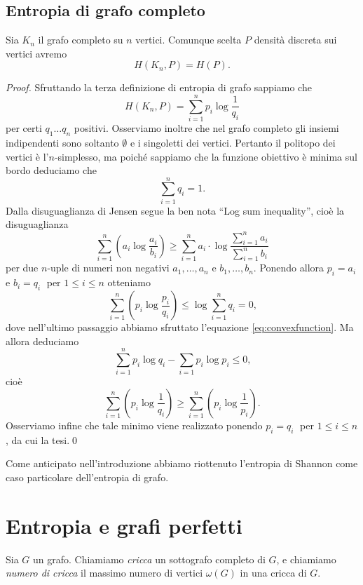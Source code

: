 \subsection{Entropia di grafo completo} 
\begin{proposition}
	Sia \(K_n\) il grafo completo su \(n\) vertici. Comunque scelta \(P\) densità discreta sui vertici avremo
	\[H(K_n,P)=H(P).\]
\end{proposition}
\begin{proof}
	Sfruttando la terza definizione di entropia di grafo sappiamo che
	\[H(K_n,P)=\sum_{i=1}^n p_i \log{\frac{1}{q_i}}\]
	per certi \(q_1\dots q_n\) positivi. Osserviamo inoltre che nel grafo completo gli insiemi indipendenti sono soltanto \(\emptyset\) e i singoletti dei vertici. Pertanto il politopo dei vertici è l'\(n\)-simplesso, ma poiché sappiamo che la funzione obiettivo è minima sul bordo deduciamo che
	\begin{equation} \label{eq:convexfunction}
	  \sum_{i=1}^n q_i = 1.
	\end{equation}
  Dalla disuguaglianza di Jensen segue la ben nota ``Log sum inequality'', cioè la disuguaglianza
  \[
    \sum_{i=1}^n{\left(a_i\log{\frac{a_i}{b_i}}\right)} \ge \sum_{i=1}^n{a_i}\cdot\log{\frac{\sum_{i=1}^n{a_i}}{\sum_{i=1}^n{b_i}}}
  \]
  per due \(n\)-uple di numeri non negativi \(a_1,\dots,a_n\) e \(b_1,\dots,b_n\).
  Ponendo allora \(p_i = a_i\) e \(b_i = q_i\;\) per \(1\le i\le n\) otteniamo
  \[
    \sum_{i=1}^n{\left(p_i\log{\frac{p_i}{q_i}}\right)} \le \log{\sum_{i=1}^n{q_i}} = 0\text{,}
  \]
  dove nell'ultimo passaggio abbiamo sfruttato l'equazione \eqref{eq:convexfunction}.
  Ma allora deduciamo
  \[
    \sum_{i=1}^n{p_i\log{q_i}} - \sum_{i=1}{p_i\log{p_i}} \le 0\text{,}
  \]
  cioè
  \[
    \sum_{i=1}^n{\left(p_i\log{\frac{1}{q_i}}\right)} \ge \sum_{i=1}^n{\left(p_i\log{\frac{1}{p_i}}\right)}\text{.}
  \]
  Osserviamo infine che tale minimo viene realizzato ponendo \(p_i = q_i\;\) per \(1\le i\le n\), da cui la tesi.\qed
\end{proof}
\begin{remark}
	Come anticipato nell'introduzione abbiamo riottenuto l'entropia di Shannon come caso particolare dell'entropia di grafo. 
\end{remark}

\section{Entropia e grafi perfetti} 
\begin{definition}
	Sia \(G\) un grafo. Chiamiamo \emph{cricca} un sottografo completo di \(G\), e chiamiamo \emph{numero di cricca} il massimo numero di vertici \(\omega(G)\) in una cricca di \(G\). 
\end{definition}


